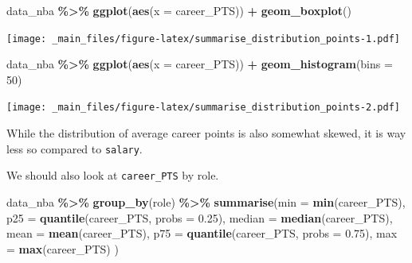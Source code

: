 \documentclass[
]{book}
\newenvironment{Shaded}{\begin{snugshade}}{\end{snugshade}}
\newcommand{\AttributeTok}[1]{\textcolor[rgb]{0.13,0.29,0.53}{#1}}
\newcommand{\DecValTok}[1]{\textcolor[rgb]{0.00,0.00,0.81}{#1}}
\newcommand{\FloatTok}[1]{\textcolor[rgb]{0.00,0.00,0.81}{#1}}
\newcommand{\FunctionTok}[1]{\textcolor[rgb]{0.13,0.29,0.53}{\textbf{#1}}}
\newcommand{\NormalTok}[1]{#1}
\newcommand{\SpecialCharTok}[1]{\textcolor[rgb]{0.81,0.36,0.00}{\textbf{#1}}}
\begin{document}
\begin{Shaded}
\begin{Highlighting}[]
\NormalTok{data\_nba }\SpecialCharTok{\%\textgreater{}\%}
  \FunctionTok{ggplot}\NormalTok{(}\FunctionTok{aes}\NormalTok{(}\AttributeTok{x =}\NormalTok{ career\_PTS)) }\SpecialCharTok{+}
  \FunctionTok{geom\_boxplot}\NormalTok{()}
\end{Highlighting}
\end{Shaded}

\texttt{[image: \_main\_files/figure-latex/summarise\_distribution\_points-1.pdf]}

\begin{Shaded}
\begin{Highlighting}[]
\NormalTok{data\_nba }\SpecialCharTok{\%\textgreater{}\%}
  \FunctionTok{ggplot}\NormalTok{(}\FunctionTok{aes}\NormalTok{(}\AttributeTok{x =}\NormalTok{ career\_PTS)) }\SpecialCharTok{+}
  \FunctionTok{geom\_histogram}\NormalTok{(}\AttributeTok{bins =} \DecValTok{50}\NormalTok{)}
\end{Highlighting}
\end{Shaded}

\texttt{[image: \_main\_files/figure-latex/summarise\_distribution\_points-2.pdf]}

While the distribution of average career points is also somewhat skewed, it is way less so compared to \texttt{salary}.

We should also look at \texttt{career\_PTS} by role.

\begin{Shaded}
\begin{Highlighting}[]
\NormalTok{data\_nba }\SpecialCharTok{\%\textgreater{}\%} 
  \FunctionTok{group\_by}\NormalTok{(role) }\SpecialCharTok{\%\textgreater{}\%} 
  \FunctionTok{summarise}\NormalTok{(}\AttributeTok{min =} \FunctionTok{min}\NormalTok{(career\_PTS),}
            \AttributeTok{p25 =} \FunctionTok{quantile}\NormalTok{(career\_PTS, }\AttributeTok{probs =} \FloatTok{0.25}\NormalTok{),}
            \AttributeTok{median =} \FunctionTok{median}\NormalTok{(career\_PTS),}
            \AttributeTok{mean =} \FunctionTok{mean}\NormalTok{(career\_PTS),}
            \AttributeTok{p75 =} \FunctionTok{quantile}\NormalTok{(career\_PTS, }\AttributeTok{probs =} \FloatTok{0.75}\NormalTok{),}
            \AttributeTok{max =} \FunctionTok{max}\NormalTok{(career\_PTS)}
\NormalTok{            )}
\end{Highlighting}
\end{Shaded}
\end{document}

